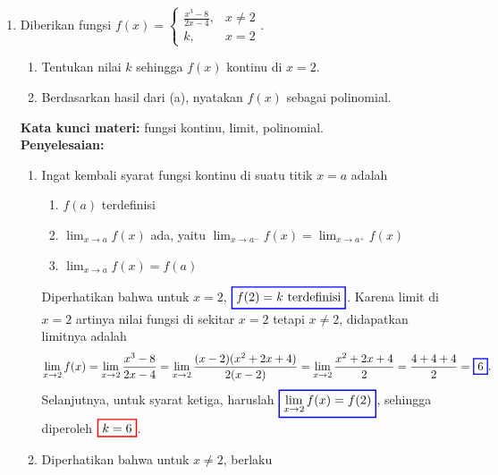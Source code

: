 \documentclass[10pt,openany,a4paper]{article}
\theoremstyle{definition}
\theoremstyle{definition}
\theoremstyle{plain}
\newenvironment{jawab}[2][tes]{
\textbf{Kata kunci materi:} #1.\\
\textbf{Penyelesaian:} #2
}{}
\begin{document}
\begin{enumerate}
    \item Diberikan fungsi \(f(x) = \begin{cases} \frac{x^3-8}{2x-4}, & x \neq 2 \\ k, & x=2 \end{cases}\).
    \begin{enumerate}
        \item Tentukan nilai \(k\) sehingga \(f(x)\) kontinu di \(x = 2\).
        \item Berdasarkan hasil dari (a), nyatakan \(f(x)\) sebagai polinomial.
    \end{enumerate}
    \begin{jawab}[fungsi kontinu, limit, polinomial]{
        \begin{enumerate}
            \item Ingat kembali syarat fungsi kontinu di suatu titik \(x = a\) adalah
            \begin{enumerate}
                \item \(f(a)\) terdefinisi
                \item \(\displaystyle \lim_{x \to a} f(x)\) ada, yaitu $\displaystyle \lim_{x \to a^-} f(x) = \lim_{x \to a^+} f(x)$
                \item \(\displaystyle\lim_{x \to a} f(x) = f(a)\)
            \end{enumerate} 
            Diperhatikan bahwa untuk \(x = 2\), \(\colorlet{oldcolor}{.}
        \color{blue}
        \setlength{\fboxrule}{1pt} \boxed{\color{oldcolor}f(2) = k~\text{terdefinisi}}\color{oldcolor}\). Karena limit di $x=2$ artinya nilai fungsi di sekitar $x=2$ tetapi $x\neq 2$, didapatkan limitnya adalah
            \begin{align*}
            \lim_{x \to 2} f(x) = \lim_{x \to 2} \frac{x^3 - 8}{2x - 4} = \lim_{x \to 2} \frac{(x-2)(x^2 + 2x + 4)}{2(x-2)} = \lim_{x \to 2} \frac{x^2 + 2x + 4}{2} = \frac{4 + 4 + 4}{2} = \colorlet{oldcolor}{.}
        \color{blue}
        \setlength{\fboxrule}{1pt} \boxed{\color{oldcolor}6}\color{oldcolor}.
            \end{align*}
            Selanjutnya, untuk syarat ketiga, haruslah $\displaystyle \colorlet{oldcolor}{.}
        \color{blue}
        \setlength{\fboxrule}{1pt} \boxed{\color{oldcolor}\lim_{x \to 2} f(x) = f(2)}\color{oldcolor}$, sehingga diperoleh $\colorlet{oldcolor}{.}
        \color{red}
        \setlength{\fboxrule}{1pt} \boxed{\color{oldcolor}k=6}\color{oldcolor}$.
        \item Diperhatikan bahwa untuk $x\neq 2$, berlaku 

\end{enumerate}}
\end{jawab}
\end{enumerate}
\end{document}
